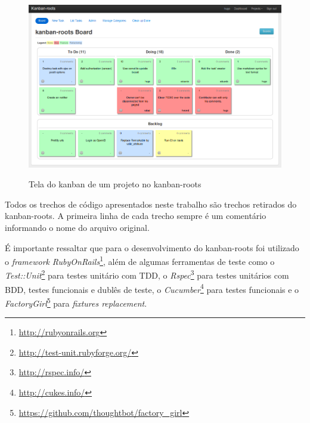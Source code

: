 \begin{figure}[h]
  \center
  \caption{Tela do kanban de um projeto no kanban-roots}
  \includegraphics[scale=0.45]{images/kanban-roots}
  \label{img:tela_kaban_roots}
\end{figure}

Todos os trechos de código apresentados neste trabalho são trechos retirados do kanban-roots. A primeira linha de cada trecho sempre é um comentário informando o nome do arquivo original.

É importante ressaltar que para o desenvolvimento do kanban-roots foi utilizado o \textit{framework} \textit{RubyOnRails}\footnote{\url{http://rubyonrails.org}}, além de algumas ferramentas de teste como o \textit{Test::Unit}\footnote{\url{http://test-unit.rubyforge.org/}} para testes unitário com TDD, o \textit{Rspec}\footnote{\url{http://rspec.info/}} para testes unitários com BDD, testes funcionais e dublês de teste, o \textit{Cucumber}\footnote{\url{http://cukes.info/}} para testes funcionais e o \textit{FactoryGirl}\footnote{\url{https://github.com/thoughtbot/factory_girl}} para \textit{fixtures replacement}.